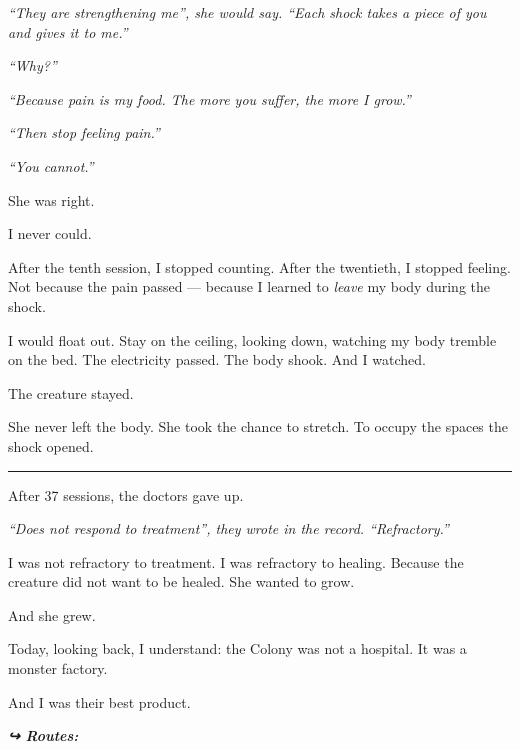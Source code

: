 \noindent \textit{\textquotedblleft{}They are strengthening me\textquotedblright{}\textit{, she would say. }\textquotedblleft{}Each shock takes a piece of you and gives it to me.\textquotedblright{}}

\noindent \textit{\textquotedblleft{}Why?\textquotedblright{}}

\noindent \textit{\textquotedblleft{}Because pain is my food. The more you suffer, the more I grow.\textquotedblright{}}

\noindent \textit{\textquotedblleft{}Then stop feeling pain.\textquotedblright{}}

\noindent \textit{\textquotedblleft{}You cannot.\textquotedblright{}}

\noindent She was right.

\noindent I never could.

\noindent After the tenth session, I stopped counting. After the twentieth, I stopped feeling. Not because the pain passed --- because I learned to \textit{leave} my body during the shock.

\noindent I would float out. Stay on the ceiling, looking down, watching my body tremble on the bed. The electricity passed. The body shook. And I watched.

\noindent The creature stayed.

\noindent She never left the body.
She took the chance to stretch.
To occupy the spaces the shock opened.

\vspace{0.5em}\noindent\rule{\textwidth}{0.5pt}\vspace{0.5em}

\noindent After 37 sessions, the doctors gave up.

\noindent \textit{\textquotedblleft{}Does not respond to treatment\textquotedblright{}\textit{, they wrote in the record. }\textquotedblleft{}Refractory.\textquotedblright{}}

\noindent I was not refractory to treatment.
I was refractory to healing.
Because the creature did not want to be healed.
She wanted to grow.

\noindent And she grew.

\noindent Today, looking back, I understand: the Colony was not a hospital.
It was a monster factory.

\noindent And I was their best product.

\vspace{0.5em}
\noindent\textit{\textbf{↪ Routes:}  \rotasep {} \rotasep {}}
